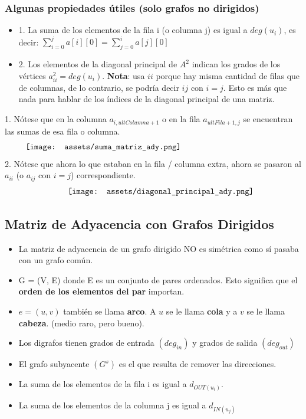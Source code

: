 \documentclass[10pt,a4paper]{article}
\begin{document}
\subsubsection*{Algunas propiedades útiles (solo grafos no dirigidos)}
\begin{itemize}
    \item 1. La suma de los elementos de la fila i (o columna j) es igual a $deg(u_{i})$, es decir: \textbf{$\sum_{i=0}^{j} a[i][0] = \sum_{j=0}^{i} a[j][0]$}
    \item 2. Los elementos de la diagonal principal de $A^{2}$ indican los grados de los vértices $a^{2}_{ii} = deg(u_{i})$. \textbf{Nota}: usa ${ii}$ porque hay misma cantidad de filas que de columnas, de lo contrario, se podría decir ${ij}$ con $i=j$. Esto es más que nada para hablar de los índices de la diagonal principal de una matriz.
\end{itemize}
1. Nótese que en la columna $a_{i, ultColumna + 1}$ o en la fila $a_{ultFila + 1, j}$ se encuentran las sumas de esa fila o columna.
\[\begin{minipage}[b]{0.9\textwidth}
    \texttt{[image: assets/suma\_matriz\_ady.png]}
\end{minipage}\]
2. Nótese que ahora lo que estaban en la fila / columna extra, ahora se pasaron al $a_{ii}$ (o $a_{ij}$ con $i=j$)  correspondiente.
\[\begin{minipage}[b]{0.6\textwidth}
    \texttt{[image: assets/diagonal\_principal\_ady.png]}
\end{minipage}\]
\subsection*{Matriz de Adyacencia con Grafos Dirigidos}
\begin{itemize}
    \item La matriz de adyacencia de un grafo dirigido NO es simétrica como sí pasaba con un grafo común.
    \item G = (V, E) donde E es un conjunto de pares ordenados. Esto significa que el \textbf{orden de los elementos del par} importan.
    \item $e=(u,v)$ también se llama \textbf{arco}. A $u$ se le llama \textbf{cola} y a $v$ se le llama \textbf{cabeza}. (medio raro, pero bueno).
    \item Los digrafos tienen grados de entrada $(deg_{in})$ y grados de salida $(deg_{out})$
    \item El grafo subyacente $(G^{s})$ es el que resulta de remover las direcciones.
    \item La suma de los elementos de la fila i es igual a $d_{OUT(u_{i})}$.
    \item La suma de los elementos de la columna j es igual a $d_{IN(u_{j})}$
\end{itemize} 
\end{document}

